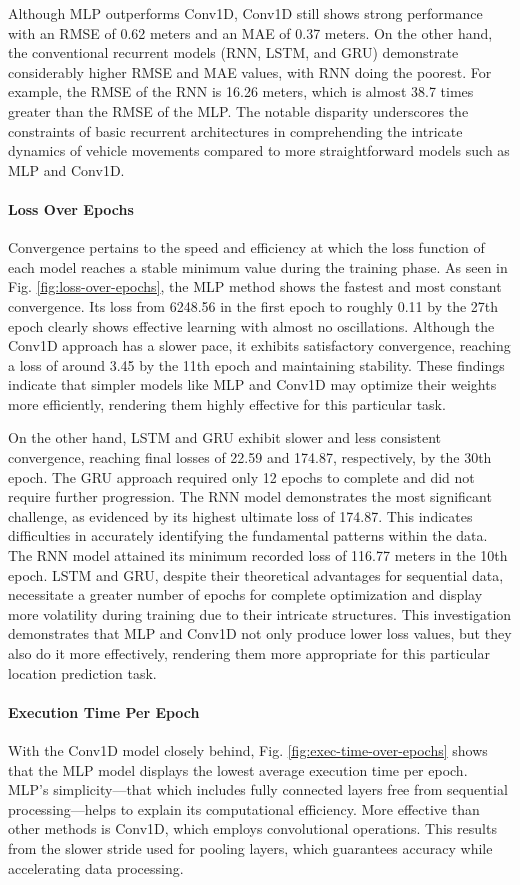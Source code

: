 \documentclass[journal,onecolumn]{IEEEtran}
\begin{document}
{Although MLP outperforms Conv1D, Conv1D still shows strong performance with an RMSE of 0.62 meters and an MAE of 0.37 meters. On the other hand, the conventional recurrent models (RNN, LSTM, and GRU) demonstrate considerably higher RMSE and MAE values, with RNN doing the poorest. For example, the RMSE of the RNN is 16.26 meters, which is almost 38.7 times greater than the RMSE of the MLP. The notable disparity underscores the constraints of basic recurrent architectures in comprehending the intricate dynamics of vehicle movements compared to more straightforward models such as MLP and Conv1D.

\paragraph{Loss Over Epochs}
Convergence pertains to the speed and efficiency at which the loss function of each model reaches a stable minimum value during the training phase. As seen in Fig. \ref{fig:loss-over-epochs}, the MLP method shows the fastest and most constant convergence. Its loss from 6248.56 in the first epoch to roughly 0.11 by the 27th epoch clearly shows effective learning with almost no oscillations. Although the Conv1D approach has a slower pace, it exhibits satisfactory convergence, reaching a loss of around 3.45 by the 11th epoch and maintaining stability. These findings indicate that simpler models like MLP and Conv1D may optimize their weights more efficiently, rendering them highly effective for this particular task.

On the other hand, LSTM and GRU exhibit slower and less consistent convergence, reaching final losses of 22.59 and 174.87, respectively, by the 30th epoch. The GRU approach required only 12 epochs to complete and did not require further progression. The RNN model demonstrates the most significant challenge, as evidenced by its highest ultimate loss of 174.87. This indicates difficulties in accurately identifying the fundamental patterns within the data. The RNN model attained its minimum recorded loss of 116.77 meters in the 10th epoch. LSTM and GRU, despite their theoretical advantages for sequential data, necessitate a greater number of epochs for complete optimization and display more volatility during training due to their intricate structures. This investigation demonstrates that MLP and Conv1D not only produce lower loss values, but they also do it more effectively, rendering them more appropriate for this particular location prediction task.

\paragraph{Execution Time Per Epoch}
With the Conv1D model closely behind, Fig. \ref{fig:exec-time-over-epochs} shows that the MLP model displays the lowest average execution time per epoch. MLP's simplicity—that which includes fully connected layers free from sequential processing—helps to explain its computational efficiency. More effective than other methods is Conv1D, which employs convolutional operations. This results from the slower stride used for pooling layers, which guarantees accuracy while accelerating data processing.

}
\end{document}
